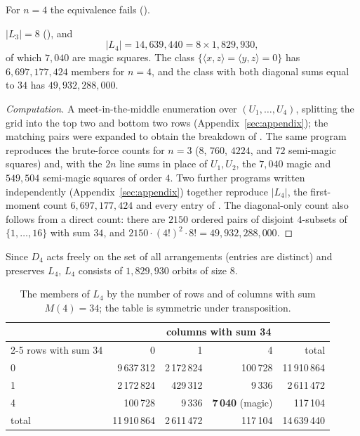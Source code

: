 For $n=4$ the equivalence fails ().

\begin{proposition}
\label{prop:L4}
$|L_3|=8$ (), and
\[
|L_4|=14{,}639{,}440=8\times1{,}829{,}930,
\]
of which $7{,}040$ are magic squares.
The class $\{\langle x,z\rangle=\langle y,z\rangle=0\}$ has $6{,}697{,}177{,}424$ members for $n=4$, and the class with both diagonal sums equal to $34$ has $49{,}932{,}288{,}000$.
\end{proposition}

\begin{proof}[Computation]
A meet-in-the-middle enumeration over $(U_1,\dots,U_4)$, splitting the grid into the top two and bottom two rows (Appendix~\ref{sec:appendix}); the matching pairs were expanded to obtain the breakdown of .
The same program reproduces the brute-force counts for $n=3$ ($8$, $760$, $4224$, and $72$ semi-magic squares) and, with the $2n$ line sums in place of $U_1,U_2$, the $7{,}040$ magic and $549{,}504$ semi-magic squares of order $4$.
Two further programs written independently (Appendix~\ref{sec:appendix}) together reproduce $|L_4|$, the first-moment count $6{,}697{,}177{,}424$ and every entry of .
The diagonal-only count also follows from a direct count: there are $2150$ ordered pairs of disjoint $4$-subsets of $\{1,\dots,16\}$ with sum $34$, and $2150\cdot(4!)^2\cdot8!=49{,}932{,}288{,}000$.
\end{proof}

Since $D_4$ acts freely on the set of all arrangements (entries are distinct) and preserves $L_4$, $L_4$ consists of $1{,}829{,}930$ orbits of size $8$.

\begin{table}[htbp]
\centering
\small
\begin{tabular}{lrrrr}
\toprule
 & \multicolumn{4}{c}{columns with sum 34} \\
\cmidrule(lr){2-5}
rows with sum 34 & 0 & 1 & 4 & total \\
\midrule
0 & 9\,637\,312 & 2\,172\,824 & 100\,728 & 11\,910\,864 \\
1 & 2\,172\,824 & 429\,312 & 9\,336 & 2\,611\,472 \\
4 & 100\,728 & 9\,336 & \textbf{7\,040} (magic) & 117\,104 \\
\midrule
total & 11\,910\,864 & 2\,611\,472 & 117\,104 & 14\,639\,440 \\
\bottomrule
\end{tabular}
\caption{The members of $L_4$ by the number of rows and of columns with sum $M(4)=34$; the table is symmetric under transposition.}
\label{tab:L4}
\end{table}

